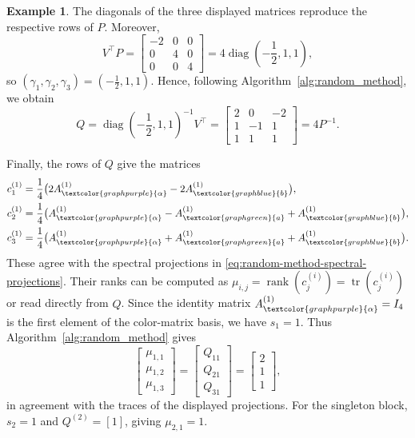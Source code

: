 \documentclass[12pt]{amsart}
\theoremstyle{plain}
\theoremstyle{definition}
\newtheorem{example}[theorem]{Example}
\theoremstyle{remark}
\newcommand{\1}{\mathbf{1}}
\newcommand{\tr}{\operatorname{tr}}
\begin{document}
\begin{example}
The diagonals of the three displayed matrices reproduce the respective
rows of $P$.
Moreover,
\[
V^\top P
=
\begin{bmatrix}
-2&0&0\\
0&4&0\\
0&0&4
\end{bmatrix}
=4\operatorname{diag}\left(-\frac12,1,1\right),
\]
so \((\gamma_1,\gamma_2,\gamma_3)=(-\frac12,1,1)\). Hence, following Algorithm~\ref{alg:random_method}, we obtain
\[
Q
=\operatorname{diag}\left(-\frac12,1,1\right)^{-1}V^\top
=\begin{bmatrix}
2&0&-2\\
1&-1&1\\
1&1&1
\end{bmatrix}
=4P^{-1}.
\]

Finally, the rows of $Q$ give the matrices
\begin{align*}
c_1^{(1)}&=\frac14\bigl(2A^{(1)}_{\textcolor{graphpurple}{\alpha}}-2A^{(1)}_{\textcolor{graphblue}{b}}\bigr),\\
c_2^{(1)}&=\frac14\bigl(A^{(1)}_{\textcolor{graphpurple}{\alpha}}-A^{(1)}_{\textcolor{graphgreen}{a}}+A^{(1)}_{\textcolor{graphblue}{b}}\bigr),\\
c_3^{(1)}&=\frac14\bigl(A^{(1)}_{\textcolor{graphpurple}{\alpha}}+A^{(1)}_{\textcolor{graphgreen}{a}}+A^{(1)}_{\textcolor{graphblue}{b}}\bigr).
\end{align*}
These agree with the spectral projections in
\eqref{eq:random-method-spectral-projections}.
Their ranks can be computed as
$\mu_{i,j}=\operatorname{rank}(c_j^{(i)})=\tr(c_j^{(i)})$
or read directly from $Q$.
Since the identity matrix
$A^{(1)}_{\textcolor{graphpurple}{\alpha}}=I_4$
is the first element of the color-matrix basis, we have $s_1=1$.
Thus Algorithm~\ref{alg:random_method} gives
\[
\begin{bmatrix}
\mu_{1,1}\\
\mu_{1,2}\\
\mu_{1,3}
\end{bmatrix}
=
\begin{bmatrix}
Q_{11}\\
Q_{21}\\
Q_{31}
\end{bmatrix}
=
\begin{bmatrix}
2\\
1\\
1
\end{bmatrix},
\]
in agreement with the traces of the displayed projections.
For the singleton block, $s_2=1$ and $Q^{(2)}=[1]$,
giving $\mu_{2,1}=1$.


\end{example}
\end{document}
